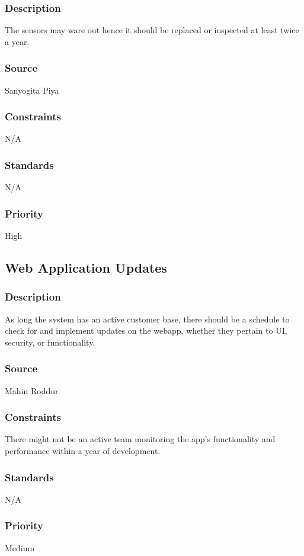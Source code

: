 \subsubsection{Description}
The sensors may ware out hence it should be replaced or inspected at least twice a year.
\subsubsection{Source}
Sanyogita Piya
\subsubsection{Constraints}
N/A
\subsubsection{Standards}
N/A
\subsubsection{Priority}
High

\subsection{Web Application Updates}
\subsubsection{Description}
As long the system has an active customer base, there should be a schedule to check for and implement updates on the webapp, whether they pertain to UI, security, or functionality.
\subsubsection{Source}
Mahin Roddur
\subsubsection{Constraints}
There might not be an active team monitoring the app's functionality and performance within a year of development.
\subsubsection{Standards}
N/A
\subsubsection{Priority}
Medium
